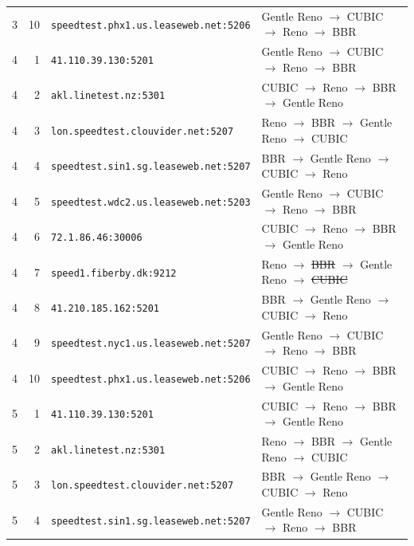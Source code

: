 \begin{longtable}{rrll}
3 & 10 & \texttt{speedtest.\allowbreak{}phx1.\allowbreak{}us.\allowbreak{}leaseweb.\allowbreak{}net:5206} & Gentle Reno $\to$ CUBIC $\to$ Reno $\to$ BBR \\
4 & 1 & \texttt{41.\allowbreak{}110.\allowbreak{}39.\allowbreak{}130:5201} & Gentle Reno $\to$ CUBIC $\to$ Reno $\to$ BBR \\
4 & 2 & \texttt{akl.\allowbreak{}linetest.\allowbreak{}nz:5301} & CUBIC $\to$ Reno $\to$ BBR $\to$ Gentle Reno \\
4 & 3 & \texttt{lon.\allowbreak{}speedtest.\allowbreak{}clouvider.\allowbreak{}net:5207} & Reno $\to$ BBR $\to$ Gentle Reno $\to$ CUBIC \\
4 & 4 & \texttt{speedtest.\allowbreak{}sin1.\allowbreak{}sg.\allowbreak{}leaseweb.\allowbreak{}net:5207} & BBR $\to$ Gentle Reno $\to$ CUBIC $\to$ Reno \\
4 & 5 & \texttt{speedtest.\allowbreak{}wdc2.\allowbreak{}us.\allowbreak{}leaseweb.\allowbreak{}net:5203} & Gentle Reno $\to$ CUBIC $\to$ Reno $\to$ BBR \\
4 & 6 & \texttt{72.\allowbreak{}1.\allowbreak{}86.\allowbreak{}46:30006} & CUBIC $\to$ Reno $\to$ BBR $\to$ Gentle Reno \\
4 & 7 & \texttt{speed1.\allowbreak{}fiberby.\allowbreak{}dk:9212} & Reno $\to$ \sout{BBR} $\to$ Gentle Reno $\to$ \sout{CUBIC} \\
4 & 8 & \texttt{41.\allowbreak{}210.\allowbreak{}185.\allowbreak{}162:5201} & BBR $\to$ Gentle Reno $\to$ CUBIC $\to$ Reno \\
4 & 9 & \texttt{speedtest.\allowbreak{}nyc1.\allowbreak{}us.\allowbreak{}leaseweb.\allowbreak{}net:5207} & Gentle Reno $\to$ CUBIC $\to$ Reno $\to$ BBR \\
4 & 10 & \texttt{speedtest.\allowbreak{}phx1.\allowbreak{}us.\allowbreak{}leaseweb.\allowbreak{}net:5206} & CUBIC $\to$ Reno $\to$ BBR $\to$ Gentle Reno \\
5 & 1 & \texttt{41.\allowbreak{}110.\allowbreak{}39.\allowbreak{}130:5201} & CUBIC $\to$ Reno $\to$ BBR $\to$ Gentle Reno \\
5 & 2 & \texttt{akl.\allowbreak{}linetest.\allowbreak{}nz:5301} & Reno $\to$ BBR $\to$ Gentle Reno $\to$ CUBIC \\
5 & 3 & \texttt{lon.\allowbreak{}speedtest.\allowbreak{}clouvider.\allowbreak{}net:5207} & BBR $\to$ Gentle Reno $\to$ CUBIC $\to$ Reno \\
5 & 4 & \texttt{speedtest.\allowbreak{}sin1.\allowbreak{}sg.\allowbreak{}leaseweb.\allowbreak{}net:5207} & Gentle Reno $\to$ CUBIC $\to$ Reno $\to$ BBR \\

\end{longtable}
